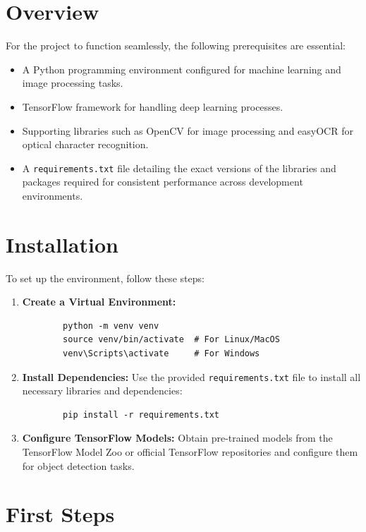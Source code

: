 \section{Overview}

For the project to function seamlessly, the following prerequisites are essential:

\begin{itemize}
	\item A Python programming environment configured for machine learning and image processing tasks.
	\item TensorFlow framework for handling deep learning processes.
	\item Supporting libraries such as OpenCV for image processing and easyOCR for optical character recognition.
	\item A \texttt{requirements.txt} file detailing the exact versions of the libraries and packages required for consistent performance across development environments.
\end{itemize}

\section{Installation}

To set up the environment, follow these steps:

\begin{enumerate}
	\item \textbf{Create a Virtual Environment:} 
	\begin{verbatim}
		python -m venv venv
		source venv/bin/activate  # For Linux/MacOS
		venv\Scripts\activate     # For Windows
	\end{verbatim}
	\item \textbf{Install Dependencies:} Use the provided \texttt{requirements.txt} file to install all necessary libraries and dependencies:
	\begin{verbatim}
		pip install -r requirements.txt
	\end{verbatim}
	\item \textbf{Configure TensorFlow Models:} Obtain pre-trained models from the TensorFlow Model Zoo or official TensorFlow repositories and configure them for object detection tasks.
\end{enumerate}

\section{First Steps}

